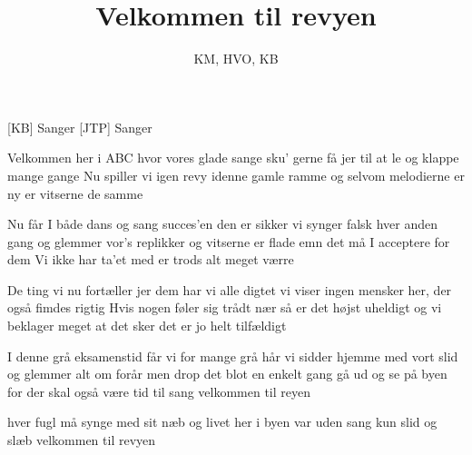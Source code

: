 \documentclass[a4paper,11pt]{article}
\title{Velkommen til revyen}
\author{KM, HVO, KB}
\begin{document}
\maketitle

\begin{roles}
[KB] Sanger
[JTP] Sanger

\end{roles}


\begin{song}
%
Velkommen her i ABC hvor vores glade sange
sku' gerne få jer til at le og klappe mange gange
Nu spiller vi igen revy idenne gamle ramme
og selvom melodierne er ny er vitserne de samme

Nu får I både dans og sang succes'en den er sikker
vi synger falsk hver anden gang og glemmer vor's replikker
og vitserne er flade emn det må I acceptere
for dem Vi ikke har ta'et med er trods alt meget værre

De ting vi nu fortæller jer dem har vi alle digtet
vi viser ingen mensker her, der også fimdes rigtig
Hvis nogen føler sig trådt nær så er det højst uheldigt
og vi beklager meget at det sker det er jo helt tilfældigt

I denne grå eksamenstid får vi for mange grå hår
vi sidder hjemme med vort slid og glemmer alt om forår
men drop det blot en enkelt gang gå ud og se på byen
for der skal også være tid til sang velkommen til reyen

hver fugl må synge med sit næb og livet her i byen
var uden sang kun slid og slæb velkommen til revyen
\end{song}
\end{document}
